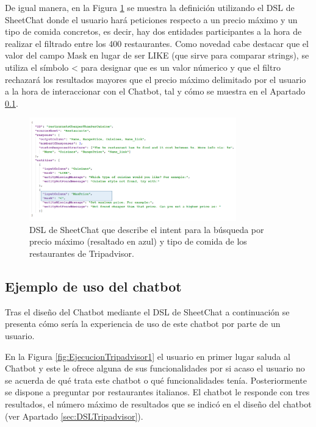 De igual manera, en la Figura \ref{fig:DSLTripadvisor2} se muestra la definición utilizando el DSL de SheetChat donde el usuario hará peticiones respecto a un precio máximo y un tipo de comida concretos, es decir, hay dos entidades participantes a la hora de realizar el filtrado entre los 400 restaurantes. Como novedad cabe destacar que el valor del campo Mask en lugar de ser LIKE (que sirve para comparar strings), se utiliza el símbolo < para designar que es un valor númerico y que el filtro rechazará los resultados mayores que el precio máximo delimitado por el usuario a la hora de interaccionar con el Chatbot, tal y cómo se muestra en el Apartado \ref{sec:EjemploUsoTripadvisor}.

\begin{figure}[htb]
	\centering
	\includegraphics[width=0.8\textwidth]{./figs/DSLTripadvisor2.png}
	\caption{DSL de SheetChat que describe el intent para la búsqueda por precio máximo (resaltado en azul) y tipo de comida de los restaurantes de Tripadvisor.}
	\label{fig:DSLTripadvisor2}
\end{figure}

\subsection{Ejemplo de uso del chatbot}
\label{sec:EjemploUsoTripadvisor}

Tras el diseño del Chatbot mediante el DSL de SheetChat a continuación se presenta cómo sería la experiencia de uso de este chatbot por parte de un usuario.

En la Figura \ref{fig:EjecucionTripadvisor1} el usuario en primer lugar saluda al Chatbot y este le ofrece alguna de sus funcionalidades por si acaso el usuario no se acuerda de qué trata este chatbot o qué funcionalidades tenía. Posteriormente se dispone a preguntar por restaurantes italianos. El chatbot le responde con tres resultados, el número máximo de resultados que se indicó en el diseño del chatbot (ver Apartado \ref{sec:DSLTripadvisor}).

